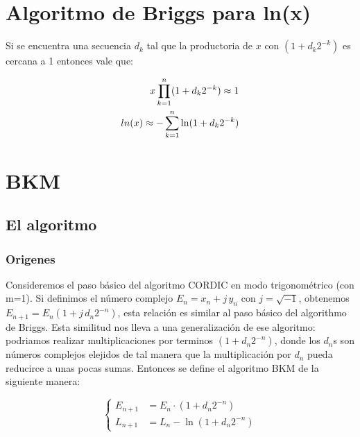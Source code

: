 \documentclass[10pt,a4paper]{book}
\begin{document}
\chapter{Algoritmo de Briggs para ln(x)}

Si se encuentra una secuencia $d_k$ tal que la productoria de $x$ con $(1+d_k 2^{-k})$ es cercana a 1 entonces vale que:

\begin{equation} \label{eq:briggs_ln}
   \begin{subequations}
      \begin{aligned}
         x \prod_{k=1}^{n} (1+d_k 2^{-k}) \approx 1     \\
         ln(x) \approx - \sum_{k=1}^{n} \ln(1+d_k 2^{-k})
      \end{aligned}
   \end{subequations}
\end{equation}


\chapter{BKM}

   \section{El algoritmo}
   \subsection{Origenes}

   Consideremos el paso básico del algoritmo CORDIC en modo trigonométrico (con m=1).
   Si definimos el número complejo $E_n = x_n + j \, y_n$ con $j=\sqrt{-1}$, obtenemos $E_{n+1} = E_n (1+j \, d_n 2^{-n})$, esta relación es similar al paso básico del algorithmo de Briggs.
   Esta similitud nos lleva a una generalización de ese algoritmo: podriamos realizar multiplicaciones por terminos $(1+d_n 2^{-n})$, donde los $d_n$s son números complejos elejidos de tal manera que la multiplicación por $d_n$ pueda reducirce a unas pocas sumas.
   Entonces se define el algoritmo BKM de la siguiente manera:

\begin{equation} \label{eq:bkm_eqs}
   \left\{
      \begin{aligned}
         E_{n+1} &= E_n \cdot (1 + d_n 2^{-n})   \\
         L_{n+1} &= L_n - \ln(1 + d_n 2^{-n})
      \end{aligned}
   \right.
\end{equation}
\end{document}
